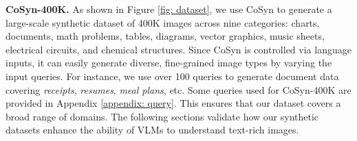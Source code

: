 \smallbreak
\noindent \textbf{CoSyn-400K.} As shown in Figure \ref{fig: dataset}, we use CoSyn to generate a large-scale synthetic dataset of 400K images across nine categories: charts, documents, math problems, tables, diagrams, vector graphics, music sheets, electrical circuits, and chemical structures.
Since CoSyn is controlled via language inputs, it can easily generate diverse, fine-grained image types by varying the input queries. 
For instance, we use over 100 queries to generate document data covering \textit{receipts}, \textit{resumes}, \textit{meal plans}, etc. 
Some queries used for CoSyn-400K are provided in Appendix \ref{appendix: query}. 
This ensures that our dataset covers a broad range of domains.
The following sections validate how our synthetic datasets enhance the ability of VLMs to understand text-rich images.